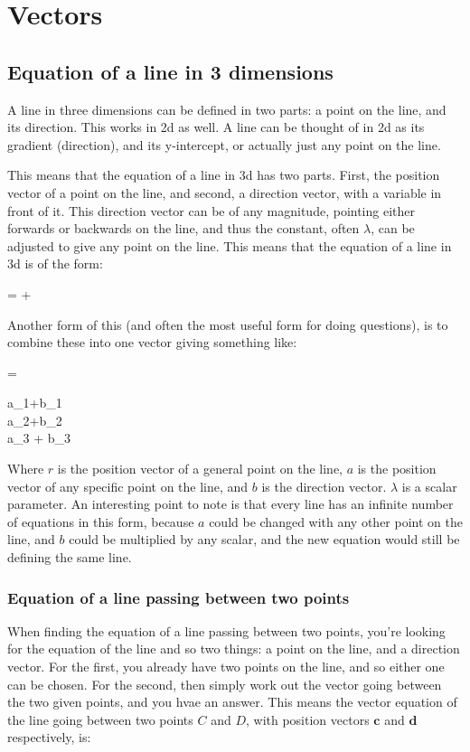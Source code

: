\section{Vectors}
\subsection{Equation of a line in 3 dimensions}
A line in three dimensions can be defined in two parts: a point on the line, and its direction. This works in 2d as well. A line can be thought of in 2d as its gradient (direction), and its y-intercept, or actually just any point on the line.

This means that the equation of a line in 3d has two parts. First, the position vector of a point on the line, and second, a direction vector, with a variable in front of it. This direction vector can be of any magnitude, pointing either forwards or backwards on the line, and thus the constant, often $\lambda$, can be adjusted to give any point on the line. This means that the equation of a line in 3d is of the form:

\begin{ea}
	 = +\lambda {}
\end{ea}

Another form of this (and often the most useful form for doing questions), is to combine these into one vector giving something like:

\begin{ea}
	 = \begin{pmatrix}a_1+\lambda b_1\\a_2+\lambda b_2\\a_3 + \lambda b_3\end{pmatrix}
\end{ea}

Where $r$ is the position vector of a general point on the line, $a$ is the position vector of any specific point on the line, and $b$ is the direction vector. $\lambda$ is a scalar parameter. An interesting point to note is that every line  has an infinite number of equations in this form, because $a$ could be changed with any other point on the line, and $b$ could be multiplied by any scalar, and the new equation would still be defining the same line.

\subsubsection{Equation of a line passing between two points}
When finding the equation of a line passing between two points, you're looking for the equation of the line and so two things: a point on the line, and a direction vector. For the first, you already have two points on the line, and so either one can be chosen. For the second, then simply work out the vector going between the two given points, and you hvae an answer. This means the vector equation of the line going between two points $C$ and $D$, with position vectors $\mathbf{c}$ and $\mathbf{d}$ respectively, is:

